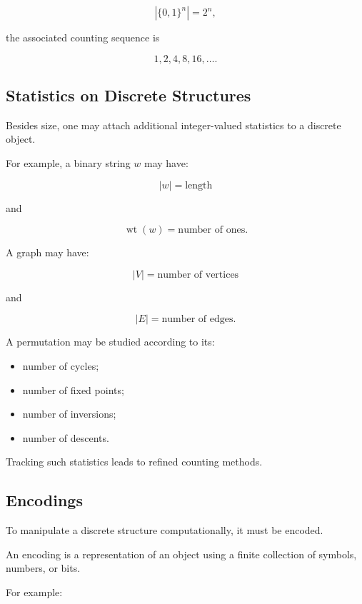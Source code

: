 \[
|\{0,1\}^{n}|=2^n,
\]

the associated counting sequence is

\[
1,2,4,8,16,\ldots.
\]

\subsection{Statistics on Discrete Structures}
\label{subsec:statistics-discrete-structures}

Besides size, one may attach additional integer-valued statistics to a
discrete object.

For example, a binary string \(w\) may have:

\[
|w|
=
\text{length}
\]

and

\[
\operatorname{wt}(w)
=
\text{number of ones}.
\]

A graph may have:

\[
|V|
=
\text{number of vertices}
\]

and

\[
|E|
=
\text{number of edges}.
\]

A permutation may be studied according to its:

\begin{itemize}
    \item number of cycles;
    \item number of fixed points;
    \item number of inversions;
    \item number of descents.
\end{itemize}

Tracking such statistics leads to refined counting methods.

\subsection{Encodings}
\label{subsec:discrete-encodings}

To manipulate a discrete structure computationally, it must be encoded.

An encoding is a representation of an object using a finite collection
of symbols, numbers, or bits.

For example:

